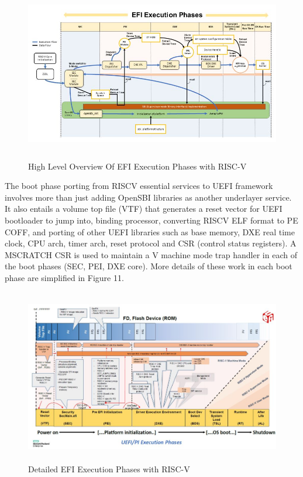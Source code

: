 \documentclass[]{rsos}%
\begin{document}
\begin{figure}[hbt!]
	\centering
	\includegraphics[width=1\textwidth,height=3in]{figs/HighLevelOverviewOfEfi.JPG}
	\caption{High Level Overview Of EFI Execution Phases with RISC-V \cite{R51:2}}
\end{figure}

The boot phase porting from RISCV essential services to UEFI framework involves more than just adding OpenSBI libraries as another underlayer service. It also entails a volume top file (VTF) that generates a reset vector for UEFI bootloader to jump into, binding processor, converting RISCV ELF format to PE COFF, and porting of other UEFI libraries such as base memory, DXE real time clock, CPU arch, timer arch, reset protocol and CSR (control status registers). A MSCRATCH CSR is used to maintain a V machine mode trap handler in each of the boot phases (SEC, PEI, DXE core). More details of these work in each boot phase are simplified in Figure 11.

\begin{figure}[hbt!]
	\centering
	\includegraphics[width=1\textwidth,height=3in]{figs/RiscVDetailedEfiFlow.JPG}
	\caption{Detailed EFI Execution Phases with RISC-V \cite{R51:2}}
\end{figure}
\end{document}
